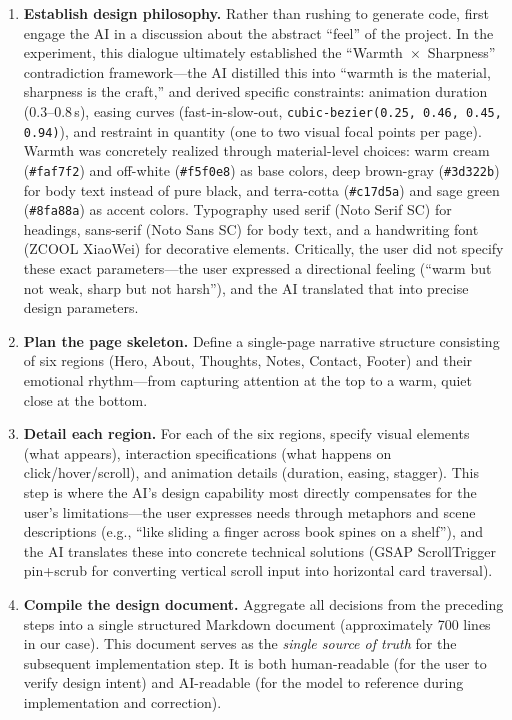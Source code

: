 \begin{enumerate}
    \item \textbf{Establish design philosophy.} Rather than rushing to generate code, first engage the AI in a discussion about the abstract ``feel'' of the project.
    In the experiment, this dialogue ultimately established the ``Warmth~$\times$~Sharpness'' contradiction framework---the AI distilled this into ``warmth is the material, sharpness is the craft,'' and derived specific constraints: animation duration (0.3--0.8\,s), easing curves (fast-in-slow-out, \texttt{cubic-bezier(0.25, 0.46, 0.45, 0.94)}), and restraint in quantity (one to two visual focal points per page).
    Warmth was concretely realized through material-level choices: warm cream (\texttt{\#faf7f2}) and off-white (\texttt{\#f5f0e8}) as base colors, deep brown-gray (\texttt{\#3d322b}) for body text instead of pure black, and terra-cotta (\texttt{\#c17d5a}) and sage green (\texttt{\#8fa88a}) as accent colors.
    Typography used serif (Noto Serif SC) for headings, sans-serif (Noto Sans SC) for body text, and a handwriting font (ZCOOL XiaoWei) for decorative elements.
    Critically, the user did not specify these exact parameters---the user expressed a directional feeling (``warm but not weak, sharp but not harsh''), and the AI translated that into precise design parameters.

    \item \textbf{Plan the page skeleton.} Define a single-page narrative structure consisting of six regions (Hero, About, Thoughts, Notes, Contact, Footer) and their emotional rhythm---from capturing attention at the top to a warm, quiet close at the bottom.

    \item \textbf{Detail each region.} For each of the six regions, specify visual elements (what appears), interaction specifications (what happens on click/hover/scroll), and animation details (duration, easing, stagger).
    This step is where the AI's design capability most directly compensates for the user's limitations---the user expresses needs through metaphors and scene descriptions (e.g., ``like sliding a finger across book spines on a shelf''), and the AI translates these into concrete technical solutions (GSAP ScrollTrigger pin+scrub for converting vertical scroll input into horizontal card traversal).

    \item \textbf{Compile the design document.} Aggregate all decisions from the preceding steps into a single structured Markdown document (approximately 700 lines in our case). This document serves as the \textit{single source of truth} for the subsequent implementation step. It is both human-readable (for the user to verify design intent) and AI-readable (for the model to reference during implementation and correction).


\end{enumerate}
